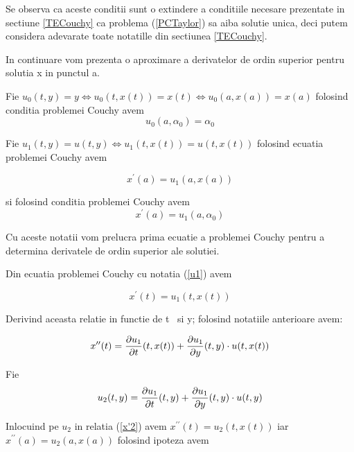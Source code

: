 \documentclass[a4paper,twoside]{book}
\begin{document}
Se observa ca aceste conditii sunt o extindere a conditiile necesare
prezentate in sectiune \ref{TECouchy} ca problema (\ref{PCTaylor}) sa aiba
solutie unica, deci putem considera adevarate toate notatille din sectiunea %
\ref{TECouchy}.

In continuare vom prezenta o aproximare a derivatelor de ordin superior
pentru solutia x in punctul a.

Fie $u_{0}(t,y)=y\Leftrightarrow u_{0}(t,x(t))=x(t)\Leftrightarrow
u_{0}(a,x(a))=x(a)$ folosind conditia problemei Couchy avem 
\begin{equation}
u_{0}(a,\alpha _{0})=\alpha _{0}  \label{u0}
\end{equation}

Fie $u_{1}(t,y)=u(t,y)\Leftrightarrow u_{1}(t,x(t))=u(t,x(t))$ folosind
ecuatia problemei Couchy avem

\begin{equation}
x^{\prime }(a)=u_{1}(a,x(a))  \label{u1}
\end{equation}

si folosind conditia problemei Couchy avem 
\begin{equation}
x^{\prime }(a)=u_{1}(a,\alpha _{0})  \label{x'a}
\end{equation}

Cu aceste notatii vom prelucra prima ecuatie a problemei Couchy pentru a
determina derivatele de ordin superior ale solutiei.

Din ecuatia problemei Couchy cu notatia (\ref{u1}) avem

\begin{equation}
x^{\prime }(t)=u_{1}(t,x(t))  \label{x'1}
\end{equation}

Derivind aceasta relatie in functie de t \ si y; folosind notatiile
anterioare avem:

\begin{equation}
x^{\prime \prime }(t)=\frac{\partial u_{1}}{\partial t}(t,x(t))+\frac{%
\partial u_{1}}{\partial y}(t,y)\cdot u(t,x(t))  \label{x'2}
\end{equation}

Fie%
\begin{equation}
u_{2}(t,y)=\frac{\partial u_{1}}{\partial t}(t,y)+\frac{\partial u_{1}}{%
\partial y}(t,y)\cdot u(t,y)  \label{u2}
\end{equation}

Inlocuind pe $u_{2}$ in relatia (\ref{x'2}) avem $x^{\prime \prime
}(t)=u_{2}(t,x(t))$ iar $x^{\prime \prime }(a)=u_{2}(a,x(a))$ folosind
ipoteza avem
\end{document}
